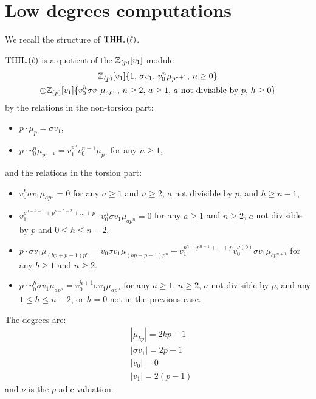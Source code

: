 
\section{Low degrees computations}

We recall the structure of $\operatorname{THH}_*(\ell)$.

\begin{theorem}
  $\operatorname{THH}_*(\ell)$ is a quotient of the $\mathbb{Z}_{(p)}[v_1]$-module
  \begin{multline}
    \mathbb{Z}_{(p)}[v_1]\{1,\,\sigma v_1,\, v_0^n\mu_{p^{n+1}},\,n\geq 0\} \\
    \oplus \mathbb{Z}_{(p)}[v_1]\{v_0^h\sigma v_1\mu_{ap^n},\, n\geq 2,\, a\geq 1,\, \mbox{$a$ not divisible by $p$},\, h \geq 0\}
  \end{multline}
  by the relations in the non-torsion part:
  \begin{itemize}
  \item $p\cdot \mu_p = \sigma v_1$,
  \item $p\cdot v_0^n\mu_{p^{n+1}} = v_1^{p^n}v_0^{n-1}\mu_{p^n}$ for any $n\geq 1$,
  \end{itemize}
  and the relations in the torsion part:
  \begin{itemize}
  \item $v_0^{h} \sigma v_1 \mu_{ap^n} = 0$ for any $a \geq 1$ and $n \geq 2$, $a$ not divisible by $p$, and $h \geq n -1$,
  \item $v_1^{p^{n-h-1}+p^{n-h-2}+\dots+p }\cdot v_0^h\sigma v_1 \mu_{ap^n} = 0$ for any $a \geq 1$ and $n \geq 2$, $a$ not divisible by $p$ and  $0 \leq h \leq n - 2$,
  \item $p\cdot \sigma v_1 \mu_{(bp+p-1)p^n} = v_0\sigma v_1\mu_{(bp+p-1)p^n}+v_1^{p^n+p^{n-1}+\dots+p}v_0^{\nu(b)}\sigma v_1 \mu_{bp^{n+1}}$ for any $b\geq 1$ and $n \geq 2$.
  \item $p\cdot v_0^h\sigma v_1 \mu_{ap^n} = v_0^{h+1}\sigma v_1 \mu_{ap^n}$ for any $a \geq 1$, $n \geq 2$, $a$ not divisible by $p$, and any $1 \leq h \leq n - 2 $, or $h=0$ not in the previous case.
  \end{itemize}
  
  The degrees are:
  \begin{equation}
    \begin{aligned}
      & |\mu_{kp}| = 2kp - 1 \\
      & |\sigma v_1| = 2p - 1 \\
      & |v_0| = 0 \\
      & |v_1| = 2(p-1)
    \end{aligned}
  \end{equation}
  and $\nu$ is the $p$-adic valuation.
\end{theorem}

